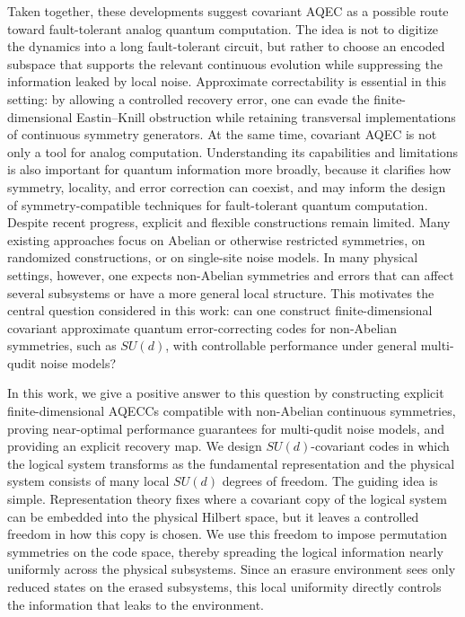 \documentclass[10pt,twocolumn,superscriptaddress,aps,amsmath,amssymb,citeautoscript,floatfix,prx]{revtex4-2}
\theoremstyle{plain}
\theoremstyle{plain}
\theoremstyle{plain}
\theoremstyle{plain}
\theoremstyle{plain}
\theoremstyle{plain}
\begin{document}
Taken together, these developments suggest covariant AQEC as a possible route toward fault-tolerant analog quantum computation. The idea is not to digitize the dynamics into a long fault-tolerant circuit, but rather to choose an encoded subspace that supports the relevant continuous evolution while suppressing the information leaked by local noise. Approximate correctability is essential in this setting: by allowing a controlled recovery error, one can evade the finite-dimensional Eastin--Knill obstruction while retaining transversal implementations of continuous symmetry generators. At the same time, covariant AQEC is not only a tool for analog computation. Understanding its capabilities and limitations is also important for quantum information more broadly, because it clarifies how symmetry, locality, and error correction can coexist, and may inform the design of symmetry-compatible techniques for fault-tolerant quantum computation. Despite recent progress, explicit and flexible constructions remain limited. Many existing approaches focus on Abelian or otherwise restricted symmetries, on randomized constructions, or on single-site noise models. In many physical settings, however, one expects non-Abelian symmetries and errors that can affect several subsystems or have a more general local structure. This motivates the central question considered in this work: can one construct finite-dimensional covariant approximate quantum error-correcting codes for non-Abelian symmetries, such as $SU(d)$, with controllable performance under general multi-qudit noise models?

In this work, we give a positive answer to this question by constructing explicit finite-dimensional AQECCs compatible with non-Abelian continuous symmetries, proving near-optimal performance guarantees for multi-qudit noise models, and providing an explicit recovery map. We design $SU(d)$-covariant codes in which the logical system transforms as the fundamental representation and the physical system consists of many local $SU(d)$ degrees of freedom. The guiding idea is simple. Representation theory fixes where a covariant copy of the logical system can be embedded into the physical Hilbert space, but it leaves a controlled freedom in how this copy is chosen. We use this freedom to impose permutation symmetries on the code space, thereby spreading the logical information nearly uniformly across the physical subsystems. Since an erasure environment sees only reduced states on the erased subsystems, this local uniformity directly controls the information that leaks to the environment.
\end{document}
